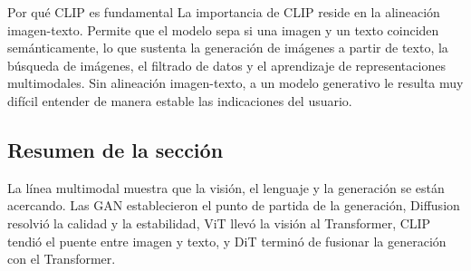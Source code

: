 \begin{importantbox}{Por qué CLIP es fundamental}
La importancia de CLIP reside en la alineación imagen-texto. Permite que el modelo sepa si una imagen y un texto coinciden semánticamente, lo que sustenta la generación de imágenes a partir de texto, la búsqueda de imágenes, el filtrado de datos y el aprendizaje de representaciones multimodales. Sin alineación imagen-texto, a un modelo generativo le resulta muy difícil entender de manera estable las indicaciones del usuario.
\end{importantbox}

\subsection{Resumen de la sección}

La línea multimodal muestra que la visión, el lenguaje y la generación se están acercando. Las GAN establecieron el punto de partida de la generación, Diffusion resolvió la calidad y la estabilidad, ViT llevó la visión al Transformer, CLIP tendió el puente entre imagen y texto, y DiT terminó de fusionar la generación con el Transformer.

